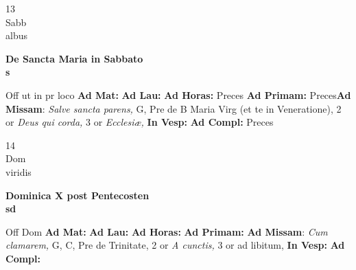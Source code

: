 \documentclass[10pt, openany]{book}
\begin{document}
        \begin{center}
            \begin{minipage}{3.5in}
                \vspace{2em}
                \begin{minipage}{0.5in}
                    {\Huge 13} \\
                    {\normalsize Sabb} \\
                    {\normalsize albus}
                \end{minipage}
                \begin{minipage}{3.0in}
                    \textbf{ \large De Sancta Maria in Sabbato \\
                    \textnormal{\normalsize s}} \\ 
                \end{minipage}
                \begin{justify}Off ut in pr loco
                    \textbf{Ad Mat: }
                    \textbf{Ad Lau: }
                    \textbf{Ad Horas: }Preces
                    \textbf{Ad Primam: }Preces\textbf{Ad Missam}: \textit{Salve sancta parens,} G, Pre de B Maria Virg (et te in Veneratione), 2 or \textit{Deus qui corda,} 3 or \textit{Ecclesiæ,}  
                    \textbf{In Vesp: }
                    \textbf{Ad Compl: }Preces
                \end{justify}
            \end{minipage}
        \end{center}
    
        \begin{center}
            \begin{minipage}{3.5in}
                \vspace{2em}
                \begin{minipage}{0.5in}
                    {\Huge 14} \\
                    {\normalsize Dom} \\
                    {\normalsize viridis}
                \end{minipage}
                \begin{minipage}{3.0in}
                    \textbf{ \large Dominica X post Pentecosten \\
                    \textnormal{\normalsize sd}} \\ 
                \end{minipage}
                \begin{justify}Off Dom
                    \textbf{Ad Mat: }
                    \textbf{Ad Lau: }
                    \textbf{Ad Horas: }
                    \textbf{Ad Primam: }\textbf{Ad Missam}: \textit{Cum clamarem,} G, C, Pre de Trinitate, 2 or \textit{A cunctis,} 3 or ad libitum,  
                    \textbf{In Vesp: }
                    \textbf{Ad Compl: }
                \end{justify}
            \end{minipage}
        \end{center}
    
\end{document}
